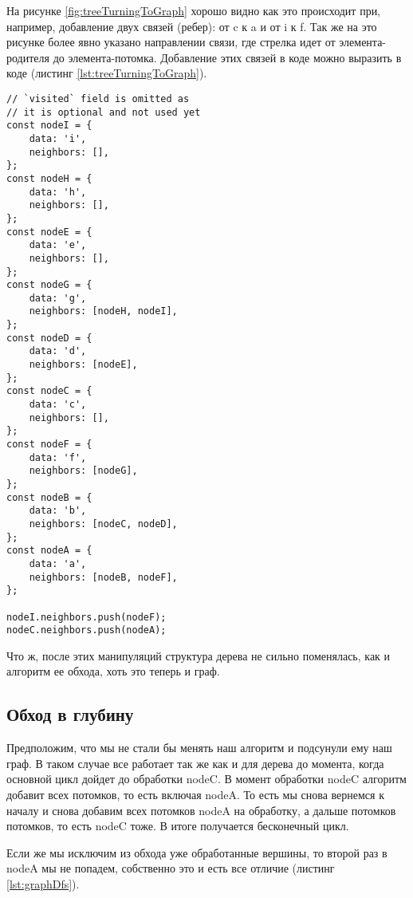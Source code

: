 \documentclass[../article.tex]{subfiles}
\begin{document}
На рисунке \ref{fig:treeTurningToGraph} хорошо видно как это происходит при, например, добавление двух связей (ребер): от {\firacodebold c} к {\firacodebold a} и от {\firacodebold i} к {\firacodebold f}. Так же на это рисунке более явно указано направлении связи, где стрелка идет от элемента-родителя до элемента-потомка. Добавление этих связей в коде можно выразить в коде (листинг \ref{lst:treeTurningToGraph}).

\begin{ruledelement}
    \begin{lstlisting}[caption={Добавление связей превращающих дерево в грфа}, label={lst:treeTurningToGraph}]
// `visited` field is omitted as
// it is optional and not used yet
const nodeI = {
    data: 'i',
    neighbors: [],
};
const nodeH = {
    data: 'h',
    neighbors: [],
};
const nodeE = {
    data: 'e',
    neighbors: [],
};
const nodeG = {
    data: 'g',
    neighbors: [nodeH, nodeI],
};
const nodeD = {
    data: 'd',
    neighbors: [nodeE],
};
const nodeC = {
    data: 'c',
    neighbors: [],
};
const nodeF = {
    data: 'f',
    neighbors: [nodeG],
};
const nodeB = {
    data: 'b',
    neighbors: [nodeC, nodeD],
};
const nodeA = {
    data: 'a',
    neighbors: [nodeB, nodeF],
};

nodeI.neighbors.push(nodeF);
nodeC.neighbors.push(nodeA);
    \end{lstlisting}
\end{ruledelement}


Что ж, после этих манипуляций структура дерева не сильно поменялась, как и алгоритм ее обхода, хоть это теперь и граф.

\subsection{Обход в глубину}

Предположим, что мы не стали бы менять наш алгоритм и подсунули ему наш граф. В таком случае все работает так же как и для дерева до момента, когда основной цикл дойдет до обработки {\firacodebold nodeC}. В момент обработки {\firacodebold nodeC} алгоритм добавит всех потомков, то есть включая {\firacodebold nodeA}. То есть мы снова вернемся к началу и снова добавим всех потомков {\firacodebold nodeA} на обработку, а дальше потомков потомков, то есть {\firacodebold nodeC} тоже. В итоге получается бесконечный цикл.

Если же мы исключим из обхода уже обработанные вершины, то второй раз в {\firacodebold nodeA} мы не попадем, собственно это и есть все отличие (листинг \ref{lst:graphDfs}).
\end{document}
